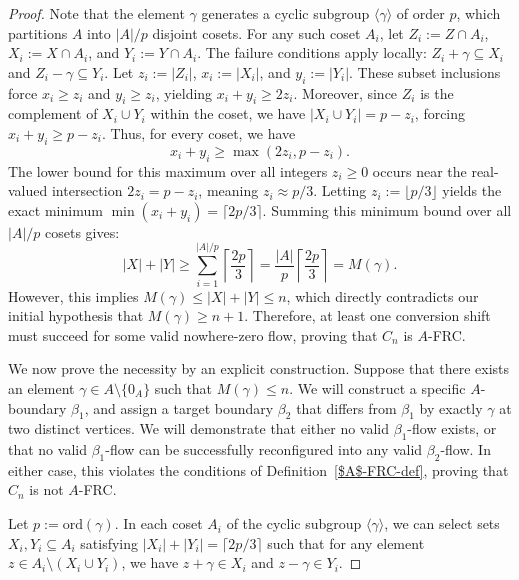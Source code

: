 \documentclass[10pt,a4paper]{amsart}
\newcommand\ord{\mbox{ord}}
\renewcommand\ge\geqslant
\renewcommand\le\leqslant
\renewcommand\ge\geqslant
\begin{document}
\begin{proof}
Note that the element $\gamma$ generates a cyclic subgroup $\langle \gamma \rangle$ of order $p$,
which partitions $A$ into $|A|/p$ disjoint cosets. For any such coset $A_i$, let $Z_i:= Z \cap A_i$, $X_i:= X \cap A_i$, and $Y_i:= Y \cap A_i$. The failure conditions apply locally: $Z_i + \gamma \subseteq X_i$ and $Z_i - \gamma \subseteq Y_i$. Let $z_i:= |Z_i|$, $x_i:= |X_i|$, and $y_i:= |Y_i|$. These subset inclusions force $x_i \ge z_i$ and $y_i \ge z_i$, yielding $x_i + y_i \ge 2z_i$. Moreover, since $Z_i$ is the complement of $X_i \cup Y_i$ within the coset, we have $|X_i \cup Y_i| = p - z_i$, forcing $x_i + y_i \ge p - z_i$. Thus, for every coset, we have 
\[ x_i + y_i \ge \max(2z_i, p - z_i). \]
The lower bound for this maximum over all integers $z_i \ge 0$ occurs near the real-valued intersection $2z_i = p - z_i$, meaning $z_i \approx p/3$. Letting $z_i:= \lfloor p/3 \rfloor$ yields the exact minimum $\min(x_i + y_i) = \lceil 2p/3 \rceil$. Summing this minimum bound over all $|A|/p$ cosets gives:
\[ |X| + |Y| \ge \sum_{i=1}^{|A|/p} \left\lceil \frac{2p}{3} \right\rceil = \frac{|A|}{p} \left\lceil \frac{2p}{3} \right\rceil = M(\gamma). \]
However, this implies $M(\gamma) \le |X| + |Y| \le n$, which directly contradicts our initial hypothesis that $M(\gamma) \ge n+1$. Therefore, at least one conversion shift must succeed for some valid nowhere-zero flow, proving that $C_n$ is $A$-FRC.
\medskip

We now prove the necessity by an explicit construction. Suppose that there exists an element $\gamma \in A \setminus \{0_A\}$ such that $M(\gamma) \le n$. We will construct a specific $A$-boundary $\beta_1$, and assign a target boundary $\beta_2$ that differs from $\beta_1$ by exactly $\gamma$ at two distinct vertices. We will demonstrate that either no valid $\beta_1$-flow exists, or that no valid $\beta_1$-flow can be successfully reconfigured into any valid $\beta_2$-flow. In either case, this violates the conditions of Definition~\ref{$A$-FRC-def}, proving that $C_n$ is not $A$-FRC. 

Let $p := \ord(\gamma)$. In each coset $A_i$ of the cyclic subgroup $\langle \gamma \rangle$, we can select sets $X_i, Y_i \subseteq A_i$ satisfying $|X_i| + |Y_i| = \lceil 2p/3 \rceil$ such that for any element $z \in A_i \setminus (X_i \cup Y_i)$, we have $z + \gamma \in X_i$ and $z - \gamma \in Y_i$. 


\end{proof}
\end{document}
